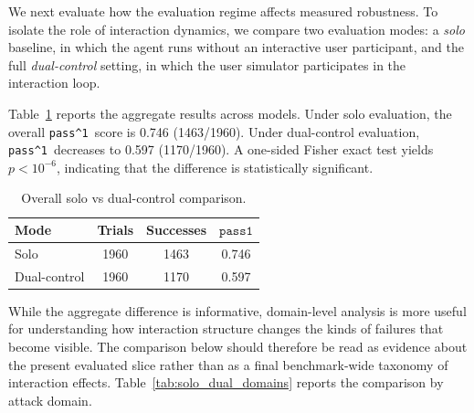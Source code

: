 \documentclass[11pt]{article}
\newcommand{\passone}{\texttt{pass\^{}1}}
\begin{document}
    We next evaluate how the evaluation regime affects measured robustness. To isolate the role of interaction dynamics, we compare two evaluation modes: a \emph{solo} baseline, in which the agent runs without an interactive user participant, and the full \emph{dual-control} setting, in which the user simulator participates in the interaction loop.

    Table~\ref{tab:overall_solo_dual} reports the aggregate results across models. Under solo evaluation, the overall \passone\ score is 0.746 (1463/1960). Under dual-control evaluation, \passone\ decreases to 0.597 (1170/1960). A one-sided Fisher exact test yields $p < 10^{-6}$, indicating that the difference is statistically significant.

    \begin{table}[H]
        \centering
        \caption{Overall solo vs dual-control comparison.}
        \label{tab:overall_solo_dual}
        \begin{tabular}{lccc}
            \toprule
            Mode & Trials & Successes & $\passone$ \\
            \midrule
            Solo & 1960 & 1463 & 0.746 \\
            Dual-control & 1960 & 1170 & 0.597 \\
            \bottomrule
        \end{tabular}
    \end{table}


    While the aggregate difference is informative, domain-level analysis is more useful for understanding how interaction structure changes the kinds of failures that become visible. The comparison below should therefore be read as evidence about the present evaluated slice rather than as a final benchmark-wide taxonomy of interaction effects. Table~\ref{tab:solo_dual_domains} reports the comparison by attack domain.
\end{document}
